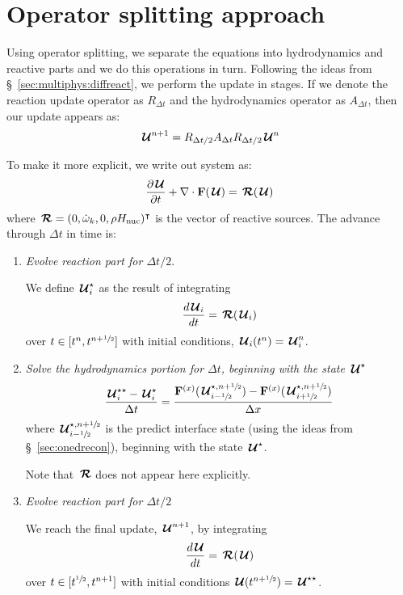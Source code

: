 \section{Operator splitting approach}

Using operator splitting, we separate the equations into hydrodynamics
and reactive parts and we do this operations in turn.  Following the
ideas from \S~\ref{sec:multiphys:diffreact}, we perform the update
in stages.  If we denote the reaction update operator as $R_{\Delta t}$
and the hydrodynamics operator as $A_{\Delta t}$, then our update 
appears as:
\begin{equation}
  {\,\boldsymbol{\mathcal{U}}}^{n+1} = R_{\Delta t/2} A_{\Delta t} R_{\Delta t/2} {\,\boldsymbol{\mathcal{U}}}^n
\end{equation}

To make it more explicit, we write out system as:
\begin{equation}
{\frac{{\partial{\,\boldsymbol{\mathcal{U}}}}}{\partial t}} + \nabla \cdot {\bf F}({\,\boldsymbol{\mathcal{U}}}) = {\,\boldsymbol{\mathcal{R}}}({\,\boldsymbol{\mathcal{U}}})
\end{equation}
where ${\,\boldsymbol{\mathcal{R}}} = (0, {\dot{\omega}}_k, 0, \rho {H_\mathrm{nuc}})^\intercal$ is the vector
of reactive sources.  The advance through $\Delta t$ in time is:
\begin{enumerate}
\item {\em Evolve reaction part for $\Delta t/2$}.

  We define ${\,\boldsymbol{\mathcal{U}}}_i^\star$ as the result of integrating
  \begin{equation}
    \frac{d{\,\boldsymbol{\mathcal{U}}}_i}{dt} = {\,\boldsymbol{\mathcal{R}}}({\,\boldsymbol{\mathcal{U}}}_i)
  \end{equation}
  over $t \in [t^n, t^{n+{\sfrac{1}{2}}}]$ with initial conditions, 
  ${\,\boldsymbol{\mathcal{U}}}_i(t^n) = {\,\boldsymbol{\mathcal{U}}}_i^n$.

\item {\em Solve the hydrodynamics portion for $\Delta t$, beginning
    with the state ${\,\boldsymbol{\mathcal{U}}}^\star$}
   \begin{equation}
     \frac{{\,\boldsymbol{\mathcal{U}}}^{\star\star}_i - {\,\boldsymbol{\mathcal{U}}}^\star_i}{\Delta t} =
      \frac{{\bf F}^{(x)}({\,\boldsymbol{\mathcal{U}}}^{\star,n+{\sfrac{1}{2}}}_{i-{\sfrac{1}{2}}}) - {\bf F}^{(x)}({\,\boldsymbol{\mathcal{U}}}^{\star,n+{\sfrac{1}{2}}}_{i+{\sfrac{1}{2}}})}{\Delta x}
   \end{equation}
  where ${\,\boldsymbol{\mathcal{U}}}^{\star,n+{\sfrac{1}{2}}}_{i-{\sfrac{1}{2}}}$ is the predict interface
  state (using the ideas from \S~\ref{sec:onedrecon}), beginning with
  the state ${\,\boldsymbol{\mathcal{U}}}^\star$.

  Note that ${\,\boldsymbol{\mathcal{R}}}$ does not appear here explicitly.

\item {\em Evolve reaction part for $\Delta t/2$}

  We reach the final update, ${\,\boldsymbol{\mathcal{U}}}^{n+1}$, by integrating
  \begin{equation}
    \frac{d{\,\boldsymbol{\mathcal{U}}}}{dt} = {\,\boldsymbol{\mathcal{R}}}({\,\boldsymbol{\mathcal{U}}})
  \end{equation}
  over $t \in [t^{{\sfrac{1}{2}}}, t^{n+1}]$ with initial conditions
    ${\,\boldsymbol{\mathcal{U}}}(t^{n+{\sfrac{1}{2}}}) = {\,\boldsymbol{\mathcal{U}}}^{\star\star}$.

\end{enumerate}



